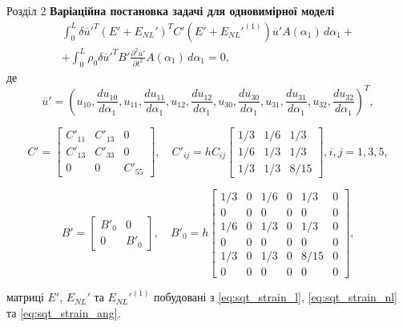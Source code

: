 \documentclass[8pt]{beamer}
\numberwithin{figure}{section}
\numberwithin{equation}{section}
\numberwithin{table}{section}
\begin{document}
\begin{frame}{Розділ 2}
\textbf{Варіаційна постановка задачі для одновимірної моделі}
\begin{multline}
\int_0^L \delta\overline{u}'^T \left( E' + E_{NL}' \right)^T C' \left( E' + E_{NL}'^{(1)} \right)\overline{u}' A\left(\alpha_1\right)\, d\alpha_1+\\+\int_0^L \rho_0 \delta\overline{u}'^T B'\frac{\partial^2 \overline{u}'}{\partial t^2} A\left(\alpha_1\right)\, d\alpha_1=0,
\end{multline}
де
\[
\overline{u}' = \left( u_{10},
\frac { du_{10}} { d \alpha_1},
u_{11},
\frac { du_{11}} { d \alpha_1},
u_{12},
\frac { du_{12}} { d \alpha_1},
u_{30},
\frac { du_{30}} { d \alpha_1},
u_{31},
\frac { du_{31}} { d \alpha_1},
u_{32},
\frac { du_{32}} { d \alpha_1}
\right)^T,
\]


\[
C'=\left[
\begin{array}{ccc}
C'_{11} & C'_{13} & 0 \\ 
C'_{13} & C'_{33} & 0 \\ 
0 & 0 & C'_{55}
\end{array} 
\right], \quad 
C'_{ij}=hC_{ij}\left[
\begin{array}{ccc}
1/3 & 1/6 & 1/3 \\ 
1/6 & 1/3 & 1/3 \\ 
1/3 & 1/3 & 8/15
\end{array} 
\right], i,j=1,3,5,
\]

\[
B'=\left[
\begin{array}{cc}
B'_0 & 0 \\ 
0 & B'_0
\end{array} 
\right], \quad 
B'_0=h\left[
\begin{array}{cccccc}
1/3 & 0 & 1/6 & 0 & 1/3 & 0 \\ 
0 & 0 & 0 & 0 & 0 & 0 \\ 
1/6 & 0 & 1/3 & 0 & 1/3 & 0 \\ 
0 & 0 & 0 & 0 & 0 & 0 \\ 
1/3 & 0 & 1/3 & 0 & 8/15 & 0\\
0 & 0 & 0 & 0 & 0 & 0 
\end{array} 
\right],
\]

матриці $E'$, $E_{NL}'$ та $E_{NL}'^{(1)}$ побудовані з \eqref{eq:sqt_strain_l}, \eqref{eq:sqt_strain_nl} та \eqref{eq:sqt_strain_ang}.

\end{frame}
\end{document}
